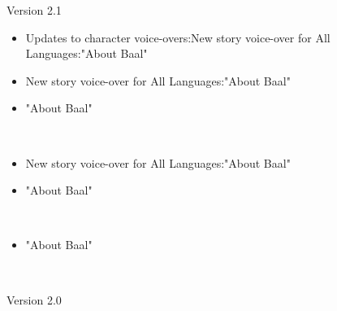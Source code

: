 \documentclass[a4paper,12pt]{article}
\begin{document}
Version 2.1\\ \par \vspace{0.5cm}

\begin{itemize}
\item Updates to character voice-overs:New story voice-over for All Languages:"About Baal"
\item New story voice-over for All Languages:"About Baal"
\item "About Baal"
\end{itemize}\\ \par \vspace{0.5cm}

\begin{itemize}
\item New story voice-over for All Languages:"About Baal"
\item "About Baal"
\end{itemize}\\ \par \vspace{0.5cm}

\begin{itemize}
\item "About Baal"
\end{itemize}\\ \par \vspace{0.5cm}

Version 2.0\\ \par \vspace{0.5cm}

\\ \par \vspace{0.5cm}

\\ \par \vspace{0.5cm}
\end{document}
